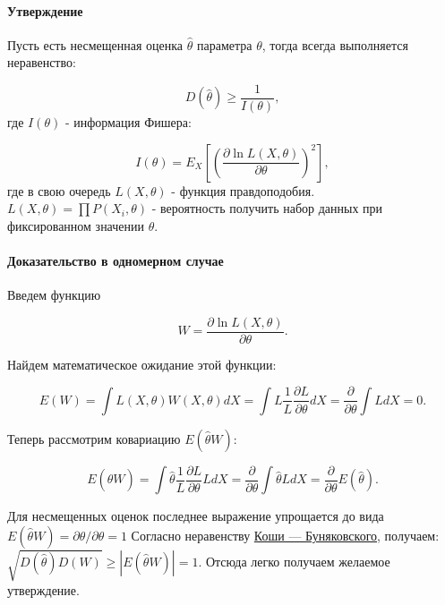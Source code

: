 \paragraph{Утверждение}

Пусть есть несмещенная оценка $\hat\theta$ параметра $\theta$, тогда
всегда выполняется неравенство:

\begin{equation}
  D(\hat\theta) \geq \frac{1}{I(\theta)},
\end{equation} где $I(\theta)$ - информация Фишера:

\begin{equation}
  I(\theta) = E_X \left[\left( \frac{\partial \ln L(X,\theta)}{\partial \theta} \right)^2 \right],
\end{equation} где в свою очередь $L(X, \theta)$ - функция
правдоподобия. $L(X,\theta) = \prod{P(X_i,\theta)}$ - вероятность
получить набор данных при фиксированном значении $\theta$.

\paragraph{Доказательство в одномерном случае}

Введем функцию

\begin{equation}
  W = \frac{\partial \ln L(X,\theta)} {\partial \theta}.
\end{equation}

Найдем математическое ожидание этой функции:

\begin{equation}
  E(W) = \int{L(X, \theta) W(X, \theta) dX} = \int{ L \frac{1}{L} \frac{\partial L}{\partial \theta} dX} = \frac{\partial}{\partial \theta} \int{L dX} = 0.
\end{equation}

Теперь рассмотрим ковариацию $E(\hat\theta W)$:

\begin{equation}
  E(\hat\theta W) = \int{\hat\theta \frac{1}{L} \frac{\partial L} {\partial {\theta}} L dX} = \frac{\partial}{\partial \theta} \int{\hat\theta L dX} =  \frac{\partial}{\partial \theta} E(\hat\theta).
\end{equation}

Для несмещенных оценок последнее выражение упрощается до вида
$E(\hat\theta W) = {\partial \theta}/{\partial \theta} = 1$ Согласно
неравенству 
\href{https://ru.wikipedia.org/wiki/\%D0\%9D\%D0\%B5\%D1\%80\%D0\%B0\%D0\%B2\%D0\%B5\%D0\%BD\%D1\%81\%D1\%82\%D0\%B2\%D0\%BE_\%D0\%9A\%D0\%BE\%D1\%88\%D0\%B8_\%E2\%80\%94_\%D0\%91\%D1\%83\%D0\%BD\%D1\%8F\%D0\%BA\%D0\%BE\%D0\%B2\%D1\%81\%D0\%BA\%D0\%BE\%D0\%B3\%D0\%BE}{Коши
--- Буняковского}, получаем:
$\sqrt{D(\hat\theta) D(W)} \geq \left| E(\hat\theta W) \right| = 1$.
Отсюда легко получаем желаемое утверждение.

